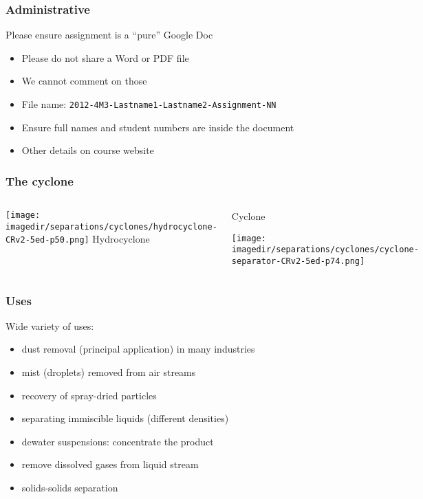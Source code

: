 
\begin{frame}\frametitle{Administrative}
	Please ensure assignment is a ``pure'' Google Doc
	\begin{itemize}
		\item	Please do not share a Word or PDF file
		\item	We cannot comment on those
		\item	File name: \texttt{2012-4M3-Lastname1-Lastname2-Assignment-NN}
		\item	Ensure full names and student numbers are inside the document
		\item	Other details on course website
	\end{itemize}
\end{frame}

\begin{frame}\frametitle{The cyclone}
	\vspace{-24pt}
	\begin{columns}[b]
			\begin{center}
				\texttt{[image: \\imagedir/separations/cyclones/hydrocyclone-CRv2-5ed-p50.png]}
				Hydrocyclone
			\end{center}
			\begin{center}
				Cyclone
				\vspace{12pt}
				
				\texttt{[image: \\imagedir/separations/cyclones/cyclone-separator-CRv2-5ed-p74.png]}
			\end{center}
	\end{columns}
\end{frame}

\begin{frame}\frametitle{Uses}
	Wide variety of uses:
	\begin{itemize}
		\item	dust removal (principal application) in many industries
		\item	mist (droplets) removed from air streams
		\item	recovery of spray-dried particles
		\item	separating immiscible liquids (different densities)
		\item	dewater suspensions: concentrate the product
		\item	remove dissolved gases from liquid stream
		\item	solids-solids separation
	\end{itemize}
\end{frame}

